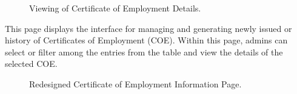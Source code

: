    \begin{figure}[H]
        \centering
        \caption{Viewing of Certificate of Employment Details.}
        \label{fig:app-coe}
    \end{figure}

    This page displays the interface for managing and generating newly issued or history of Certificates of Employment (COE). Within this page, admins can select or filter among the entries from the table and view the details of the selected COE. 

    \begin{figure}[H]
        \centering
        \caption{Redesigned Certificate of Employment Information Page.}
        \label{fig:app-coe-info}
    \end{figure}

